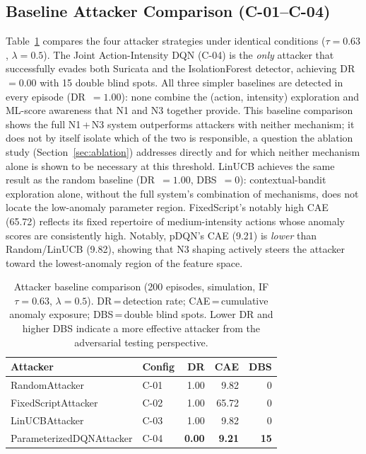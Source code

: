 \documentclass[sigconf]{acmart}
\begin{document}
\subsection{Baseline Attacker Comparison (C-01--C-04)}
\label{sec:baseline}

Table~\ref{tab:baseline} compares the four attacker strategies under
identical conditions ($\tau=0.63$, $\lambda=0.5$). The Joint
Action-Intensity DQN (C-04) is the \emph{only} attacker that successfully evades both Suricata
and the IsolationForest detector, achieving DR~$= 0.00$ with 15 double
blind spots. All three simpler baselines are detected in every episode
(DR~$= 1.00$): none combine the (action, intensity) exploration and
ML-score awareness that N1 and N3 together provide. This baseline
comparison shows the full N1\,+\,N3 system outperforms attackers with
neither mechanism; it does not by itself isolate which of the two is
responsible, a question the ablation study
(Section~\ref{sec:ablation}) addresses directly and for which neither
mechanism alone is shown to be necessary at this threshold. LinUCB
achieves the same result as the random baseline (DR~$= 1.00$,
DBS~$= 0$): contextual-bandit exploration alone, without the full
system's combination of mechanisms, does not locate the low-anomaly
parameter region. FixedScript's notably high CAE (65.72) reflects its
fixed repertoire of medium-intensity actions whose anomaly scores are
consistently high. Notably, pDQN's CAE (9.21) is \emph{lower} than
Random/LinUCB (9.82), showing that N3 shaping actively steers the
attacker toward the lowest-anomaly region of the feature space.

\begin{table}[t]
\caption{Attacker baseline comparison (200 episodes, simulation, IF $\tau=0.63$, $\lambda=0.5$).
DR\,=\,detection rate; CAE\,=\,cumulative anomaly exposure; DBS\,=\,double blind spots.
Lower DR and higher DBS indicate a more effective attacker from the adversarial testing perspective.}
\label{tab:baseline}
\centering
\begin{tabular}{l l r r r}
\toprule
Attacker & Config & DR & CAE & DBS \\
\midrule
RandomAttacker      & C-01 & 1.00 &  9.82 &  0 \\
FixedScriptAttacker & C-02 & 1.00 & 65.72 &  0 \\
LinUCBAttacker      & C-03 & 1.00 &  9.82 &  0 \\
ParameterizedDQNAttacker & C-04 & \textbf{0.00} & \textbf{9.21} & \textbf{15} \\
\bottomrule
\end{tabular}
\end{table}
\end{document}
